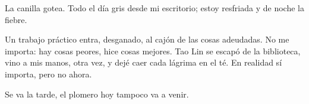 
La canilla gotea. Todo el día gris desde mi escritorio; estoy resfriada
y de noche la fiebre.

Un trabajo práctico entra, desganado, al cajón de las cosas adeudadas.
No me importa: hay cosas peores, hice cosas mejores. Tao Lin se escapó de
la biblioteca, vino a mis manos, otra vez, y dejé caer cada lágrima en el té.
En realidad sí importa, pero no ahora.

Se va la tarde, el plomero hoy tampoco va a venir.

